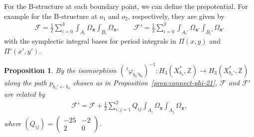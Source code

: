 \documentclass[10pt,a4paper]{amsart}
\numberwithin{equation}{section}
\newtheorem{Proposition}[Theorem]{Proposition}
\begin{document}
For the B-structure at each boundary point, we can define the prepotential. For example for the B-structure at $o_{1}$ and $o_{2}$, respectively,
they are given by
\begin{gather*}
\mathcal{F}=\frac{1}{2}\sum_{i=0}^{3}\int_{A_{i}}\Omega_{\bm{x}}\int_{B_{i}}\Omega_{\bm{x}},\qquad \mathcal{F}'=\frac{1}{2}\sum_{i=0}^{3}\int_{A_{i}'}\Omega_{\bm{x}'}\int_{B_{i}'}\Omega_{\bm{x}'}
\end{gather*}
with the symplectic integral bases for period integrals in $\Pi(x,y)$ and $\Pi'(x',y')$.
\begin{Proposition}\label{prop:prepot-F}By the isomorphism $(\,^{t}\varphi_{b_{o}'b_{o}})^{-1}\colon H_{3}(X_{b_{o}}^{*},\mathbb{Z})\to H_{3}(X_{b_{o}'}^{*},\mathbb{Z})$ along the path $p_{b_{o}'\leftarrow b_{o}}$ chosen as in Proposition~{\rm \ref{prop:connect-phi-21}}, $\mathcal{F}$ and $\mathcal{F}'$ are related by
\begin{gather*}
\mathcal{F}'=\mathcal{F}+\frac{1}{2}\sum_{i,j=1}^{2}Q_{ij}\int_{A_{i}}\Omega_{\bm{x}}\int_{A_{j}}\Omega_{\bm{x}},
\end{gather*}
where $(Q_{ij})=\left(\begin{smallmatrix}-25 & -2\\
2 & 0
\end{smallmatrix}\right)$.\end{Proposition}
\end{document}
